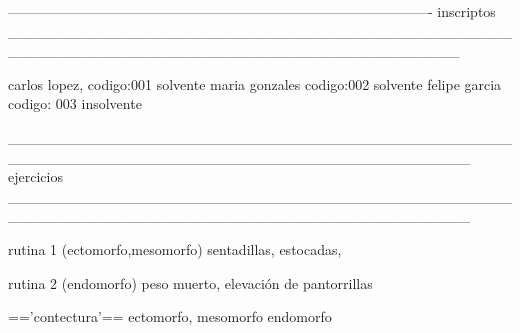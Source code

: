 -------------------------------------------------------------------------------------------
                                inscriptos
___________________________________________________________________________________________

carlos lopez, codigo:001 solvente
maria gonzales codigo:002 solvente
felipe garcia codigo: 003 insolvente



____________________________________________________________________________________________
                              ejercicios
____________________________________________________________________________________________

 rutina 1 (ectomorfo,mesomorfo)
sentadillas, 
estocadas,

rutina 2 (endomorfo)
peso muerto, 
elevación de pantorrillas


=='contectura'==
ectomorfo,
mesomorfo 
endomorfo

